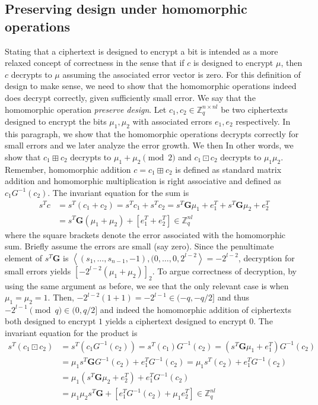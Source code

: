 \subsection*{Preserving design under homomorphic operations}
Stating that a ciphertext is designed to encrypt a bit is intended as a more relaxed concept of correctness in the sense that if $c$ is designed to encrypt $\mu$, then $c$ decrypts to $\mu$ assuming the associated error vector is zero. For this definition of design to make sense, we need to show that the homomorphic operations indeed does decrypt correctly, given sufficiently small error. We say that the homomorphic operation \textit{preserve design}.
Let $c_1, c_2 \in \mathbb{Z}_q^{n \times nl}$ be two ciphertexts designed to encrypt the bits $\mu_1, \mu_2$ with associated errors $e_1, e_2$ respectively. In this paragraph, we show that the homomorphic operations decrypts correctly for small errors and we later analyze the error growth. We then In other words, we show that $c_1 \boxplus c_2$ decrypts to $\mu_1 + \mu_2 \pmod 2$ and $c_1 \boxdot c_2$ decrypts to $\mu_1 \mu_2$. Remember, homomorphic addition $c = c_1 \boxplus c_2$ is defined as standard matrix addition and homomorphic multiplication is right associative and defined as $c_1 G^{-1}(c_2)$. The invariant equation for the sum is
\begin{equation}\label{eq:invariant_sum}
    \begin{aligned}
    s^Tc &= s^T(c_1 + c_2) = s^Tc_1 + s^Tc_2 = s^T \mathbf{G}\mu_1 + e_1^T + s^T \mathbf{G} \mu_2 + e_2^T \\
    &= s^T\mathbf{G}(\mu_1 + \mu_2) + [e_1^T + e_2^T] \in \mathbb{Z}_q^{nl}    
    \end{aligned}
\end{equation}
where the square brackets denote the error associated with the homomorphic sum. Briefly assume the errors are small (say zero). Since the penultimate element of $s^T\mathbf{G}$ is $\left \langle (s_1, \dots, s_{n-1}, -1),(0, \dots, 0, 2^{l-2} \right \rangle = -2^{l-2}$, decryption for small errors yields $[-2^{l-2}(\mu_1 + \mu_2)]_2$. To argue correctness of decryption, by using the same argument as before, we see that the only relevant case is when $\mu_1 = \mu_2 = 1$. Then, $-2^{l-2}(1 + 1) = - 2^{l-1} \in (-q,-q/2]$ and thus $- 2^{l-1} \pmod q \in (0,q/2]$ and indeed the homomorphic addition of ciphertexts both designed to encrypt $1$ yields a ciphertext designed to encrypt $0$.
The invariant equation for the product is
\begin{equation}\label{eq:invariant_product}
    \begin{aligned}
    s^T(c_1 \boxdot c_2) &= s^T(c_1 G^{-1}(c_2)) = s^T(c_1)G^{-1}(c_2) = (s^T\mathbf{G}\mu_1 + e_1^T)G^{-1}(c_2) \\
    &= \mu_1 s^T \mathbf{G}G^{-1}(c_2) + e_1^TG^{-1}(c_2) = \mu_1 s^T(c_2) + e_1^TG^{-1}(c_2) \\
    &= \mu_1(s^T\mathbf{G}\mu_2 + e_2^T) + e_1^TG^{-1}(c_2)\\
    &= \mu_1\mu_2 s^T\mathbf{G} + [e_1^TG^{-1}(c_2) + \mu_1 e_2^T] \in \mathbb{Z}_q^{nl}
    \end{aligned}
\end{equation}
